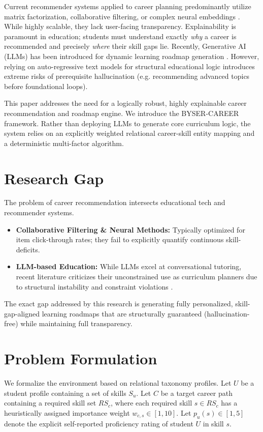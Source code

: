 \documentclass[conference]{IEEEtran}
\begin{document}
Current recommender systems applied to career planning predominantly utilize matrix factorization, collaborative filtering, or complex neural embeddings \cite{lu15}. While highly scalable, they lack user-facing transparency. Explainability is paramount in education; students must understand exactly \textit{why} a career is recommended and precisely \textit{where} their skill gaps lie. Recently, Generative AI (LLMs) has been introduced for dynamic learning roadmap generation \cite{ng23}. However, relying on auto-regressive text models for structural educational logic introduces extreme risks of prerequisite hallucination (e.g. recommending advanced topics before foundational loops).

This paper addresses the need for a logically robust, highly explainable career recommendation and roadmap engine. We introduce the BYSER-CAREER framework. Rather than deploying LLMs to generate core curriculum logic, the system relies on an explicitly weighted relational career-skill entity mapping and a deterministic multi-factor algorithm. 

\section{Research Gap}
The problem of career recommendation intersects educational tech and recommender systems. 
\begin{itemize}
    \item \textbf{Collaborative Filtering \& Neural Methods:} Typically optimized for item click-through rates; they fail to explicitly quantify continuous skill-deficits. 
    \item \textbf{LLM-based Education:} While LLMs excel at conversational tutoring, recent literature criticizes their unconstrained use as curriculum planners due to structural instability and constraint violations \cite{ng23}. 
\end{itemize}
The exact gap addressed by this research is generating fully personalized, skill-gap-aligned learning roadmaps that are structurally guaranteed (hallucination-free) while maintaining full transparency. 

\section{Problem Formulation}
We formalize the environment based on relational taxonomy profiles. Let $U$ be a student profile containing a set of skills $S_u$. Let $C$ be a target career path containing a required skill set $RS_c$, where each required skill $s \in RS_c$ has a heuristically assigned importance weight $w_{c,s} \in [1, 10]$. Let $p_u(s) \in [1, 5]$ denote the explicit self-reported proficiency rating of student $U$ in skill $s$.
\end{document}
